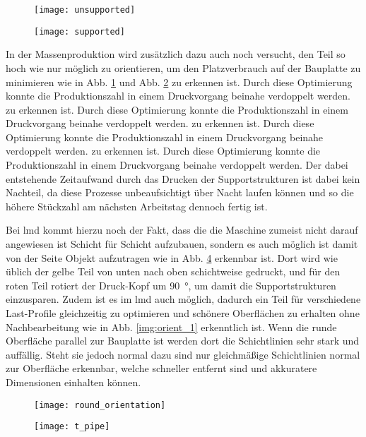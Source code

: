 \documentclass[../main.tex]{subfiles}
\begin{document}
\begin{figure}[H]
	\centering
	\texttt{[image: unsupported]}
	\label{img:unsupp_1}
\end{figure}
\begin{figure}[H]
	\centering
	\texttt{[image: supported]}
	\label{img:supp_1}
\end{figure}
In der Massenproduktion wird zusätzlich dazu auch noch versucht, den Teil so hoch wie nur möglich zu orientieren, um den Platzverbrauch auf der Bauplatte zu minimieren wie in Abb. \ref{img:unsupp_1} und Abb. \ref{img:supp_1} zu erkennen ist. Durch diese Optimierung konnte die Produktionszahl in einem Druckvorgang beinahe verdoppelt werden.  zu erkennen ist. Durch diese Optimierung konnte die Produktionszahl in einem Druckvorgang beinahe verdoppelt werden.  zu erkennen ist. Durch diese Optimierung konnte die Produktionszahl in einem Druckvorgang beinahe verdoppelt werden.  zu erkennen ist. Durch diese Optimierung konnte die Produktionszahl in einem Druckvorgang beinahe verdoppelt werden. Der dabei entstehende Zeitaufwand durch das Drucken der Supportstrukturen ist dabei kein Nachteil, da diese Prozesse unbeaufsichtigt über Nacht laufen können und so die höhere Stückzahl am nächsten Arbeitstag dennoch fertig ist. \cite{lim2015}

Bei \acrfull{lmd} kommt hierzu noch der Fakt, dass die die Maschine zumeist nicht darauf angewiesen ist Schicht für Schicht aufzubauen, sondern es auch möglich ist damit von der Seite Objekt aufzutragen wie in Abb. \ref{img:t_pipe} erkennbar ist. Dort wird wie üblich der gelbe Teil von unten nach oben schichtweise gedruckt, und für den roten Teil rotiert der Druck-Kopf um \qty{90}{\degree}, um damit die Supportstrukturen einzusparen. Zudem ist es im \acrshort{lmd} auch möglich, dadurch ein Teil für verschiedene Last-Profile gleichzeitig zu optimieren und schönere Oberflächen zu erhalten ohne Nachbearbeitung wie in Abb. \ref{img:orient_1} erkenntlich ist. Wenn die runde Oberfläche parallel zur Bauplatte ist werden dort die Schichtlinien sehr stark und auffällig. Steht sie jedoch normal dazu sind nur gleichmäßige Schichtlinien normal zur Oberfläche erkennbar, welche schneller entfernt sind und akkuratere Dimensionen einhalten können.
\begin{figure}[H]
	\centering
	\texttt{[image: round\_orientation]}

	\label{img:round_orient}
\end{figure}
\begin{figure}[H]
	\centering
	\texttt{[image: t\_pipe]}
	\label{img:t_pipe}
\end{figure}
\end{document}
